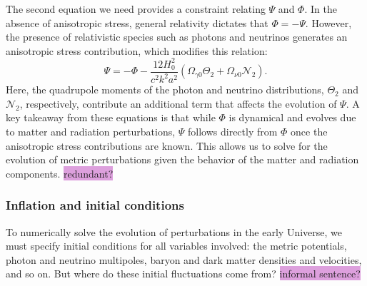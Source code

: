 \documentclass{aa}
\numberwithin{equation}{section}
\numberwithin{table}{section}
\numberwithin{figure}{section}
\begin{document}
The second equation we need provides a constraint relating $\Psi$ and $\Phi$. In the absence of anisotropic stress, general relativity dictates that $\Phi = -\Psi$. However, the presence of relativistic species such as photons and neutrinos generates an anisotropic stress contribution, which modifies this relation:
\begin{equation}
\Psi = -\Phi - \frac{12 H_0^2}{c^2 k^2 a^2} \left( \Omega_{\gamma0} \Theta_2 + \Omega_{\nu0} \mathcal{N}_2 \right).
\end{equation}
Here, the quadrupole moments of the photon and neutrino distributions, $\Theta_2$ and $\mathcal{N}_2$, respectively, contribute an additional term that affects the evolution of $\Psi$. 
A key takeaway from these equations is that while $\Phi$ is dynamical and evolves due to matter and radiation perturbations, $\Psi$ follows directly from $\Phi$ once the anisotropic stress contributions are known. This allows us to solve for the evolution of metric perturbations given the behavior of the matter and radiation components. \colorbox{Plum}{redundant?}





\subsubsection{Inflation and initial conditions}
To numerically solve the evolution of perturbations in the early Universe, we must specify initial conditions for all variables involved: the metric potentials, photon and neutrino multipoles, baryon and dark matter densities and velocities, and so on. But where do these initial fluctuations come from? \colorbox{Plum}{informal sentence?}
\end{document}
